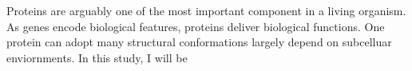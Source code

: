 Proteins are arguably one of the most important component in a living organism. As genes encode biological features, proteins deliver biological functions. One protein can adopt many structural conformations largely depend on subcelluar enviornments.    In this study, I will be 